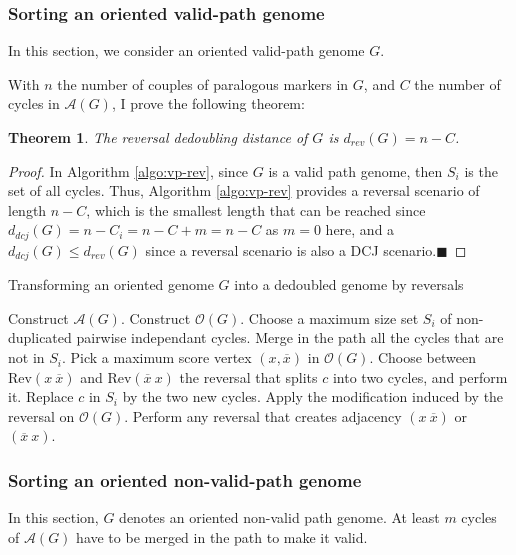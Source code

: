 \documentclass[11pt,final,twoside,nofrench]{thlifl}
\newcommand{\qed}{\ensuremath{\blacksquare}}
\newcommand{\snd}[1]{ \ensuremath{\overline{#1}} }
\newtheorem{proof}{Proof}
\newtheorem{theorem}{Theorem}
\begin{document}
\subsubsection{Sorting an oriented valid-path genome}

In this section, we consider an oriented valid-path genome $G$.

With $n$ the number of couples of paralogous 
markers in $G$, and $C$ the number of cycles in  $\mathcal{A}(G)$, I prove the following theorem:

\begin{theorem}
\label{th:vp-rev}
The reversal dedoubling distance of $G$ is  $d_{rev}(G) = n-C$.
\end{theorem}
\begin{proof}
In Algorithm \ref{algo:vp-rev}, since $G$ is a valid path genome, then
$S_i$ is the set of all cycles. Thus,  Algorithm \ref{algo:vp-rev}
 provides a reversal scenario of length $n-C$, 
which is the smallest length that can be reached since 
$d_{dcj}(G) = n-C_i=n-C+m=n-C$ as $m=0$ here, and a $d_{dcj}(G) \leq d_{rev}(G)$ since a reversal scenario is also a DCJ scenario.\qed
\end{proof}

\begin{algorithm}
\caption{Transforming an oriented genome $G$ into a dedoubled genome by reversals}
\label{algo:vp-rev}
\begin{algorithmic}[1]
\STATE Construct $\mathcal{A}(G)$.
\STATE Construct $\mathcal{O}(G)$.
\STATE Choose a maximum size set $S_i$ of non-duplicated pairwise independant cycles.
\STATE Merge in the path all the cycles that are not in $S_i$.
\STATE Pick a maximum score vertex $(x,\snd{x})$ in $\mathcal{O}(G)$.
\IF{$(x,\snd{x})$ is contained in a cycle $c$ of $S_i$}
\STATE Choose between $\text{Rev}(x~\snd{x})$ and $\text{Rev}(\snd{x}~x)$ the
reversal that splits $c$ into two cycles, and perform it. 
\STATE Replace $c$ in $S_i$ by the two new cycles.
\STATE Apply the modification induced by the reversal on $\mathcal{O}(G)$.
\ELSE
\STATE Perform any reversal that creates adjacency $(x~\snd{x})$ or $(\snd{x}~x)$.
\ENDIF
\ENDWHILE
\end{algorithmic}
\end{algorithm}
\vspace{-5mm}

\subsubsection{Sorting an oriented non-valid-path genome}
In this section, $G$ denotes an oriented non-valid path genome. At least $m$ cycles of $\mathcal{A}(G)$ have to be merged in the path to make it valid.
\end{document}
